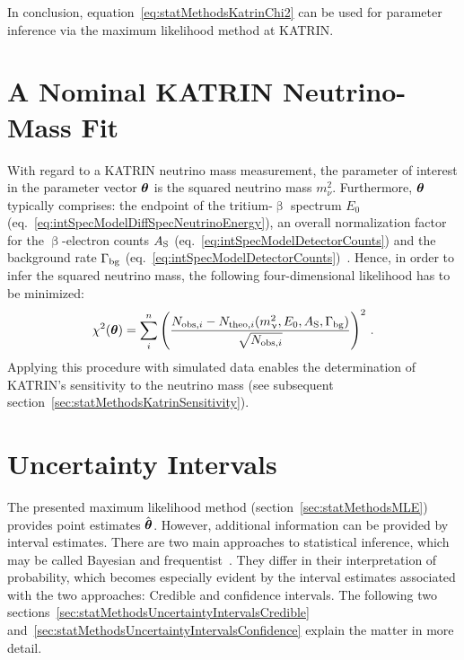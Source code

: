 In conclusion, equation~\eqref{eq:statMethodsKatrinChi2} can be used for parameter inference via the maximum likelihood method at KATRIN.

\section{A Nominal KATRIN Neutrino-Mass Fit}
\label{sec:statMethodsStandardFit}
With regard to a KATRIN neutrino mass measurement, the parameter of interest in the parameter vector $\boldsymbol{\mathbf{\theta}}$ is the squared neutrino mass $m_\nu^2$. Furthermore, $\boldsymbol{\mathbf{\theta}}$ typically comprises: the endpoint of the tritium-$\upbeta$ spectrum $E_0$ (eq.~\ref{eq:intSpecModelDiffSpecNeutrinoEnergy}), an overall normalization factor for the $\upbeta$-electron counts $A_{\mathrm{S}}$ (eq.~\ref{eq:intSpecModelDetectorCounts}) and the background rate $\Gamma_{\mathrm{bg}}$ (eq.~\ref{eq:intSpecModelDetectorCounts})~\cite{Kleesiek2014,Angrik:2005ep}. Hence, in order to infer the squared neutrino mass, the following four-dimensional likelihood has to be minimized:
\begin{equation}
\label{eq:statMethodsNominalKatrinChi2}
\chi^2(\boldsymbol{\mathbf{\theta}}) = \sum_i^n
\left( 
\frac{N_{\mathrm{obs,}i}-N_{\mathrm{theo,}i}(m_\upnu^2,E_0,A_{\mathrm{S}}, \Gamma_{\mathrm{bg}})}{\sqrt{N_{\mathrm{obs,}i}}}
\right)^2
\text{\,.}
\end{equation}
Applying this procedure with simulated data enables the determination of KATRIN's sensitivity to the neutrino mass (see subsequent section~\ref{sec:statMethodsKatrinSensitivity}).

\section{Uncertainty Intervals}
\label{sec:statMethodsUncertaintyIntervals}
The presented maximum likelihood method (section~\ref{sec:statMethodsMLE}) provides point estimates $\hat{\boldsymbol{\mathbf{\theta}}}$. However, additional information can be provided by interval estimates. There are two main approaches to statistical inference, which may be called Bayesian and frequentist~\cite{ReviewOfParticlePhysics}. They differ in their interpretation of probability, which becomes especially evident by the interval estimates associated with the two approaches: Credible and confidence intervals. The following two sections~\ref{sec:statMethodsUncertaintyIntervalsCredible} and~\ref{sec:statMethodsUncertaintyIntervalsConfidence} explain the matter in more detail.

